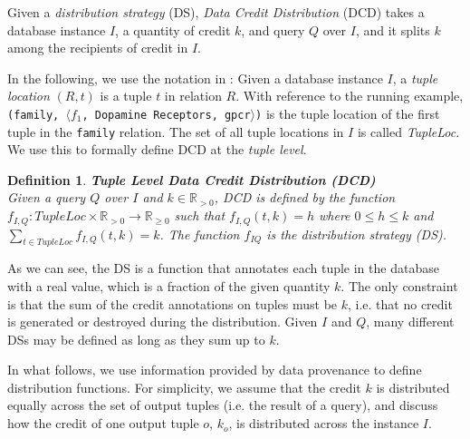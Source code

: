 \documentclass[preprint,12pt,sort&compress]{elsarticle}
\newtheorem{definition}{Definition}[section]
\newcommand{\eat}[1]{}
\begin{document}
Given a \emph{distribution strategy} (DS),  \emph{Data Credit Distribution} (DCD) takes a database instance $I$, a quantity of credit $k$, %
and query $Q$ over $I$, and it splits $k$ among the recipients of credit in $I$.

\eat{
In the following, we use the notation in \citet{CheneyProvSurvey}: a \emph{tuple location} is defined as a tuple in a relation in $I$, tagged with its name. It is indicated with $(R, t)$, where $R$ is the relation in the database, and $t$ is the tuple in $R$. With reference to the running example, \texttt{(family, $\langle f_1$, Dopamine Receptors, gpcr$\rangle$)} is the tuple location of the first tuple in the \texttt{family} relation.  The set of all the tuple locations in $I$ is called \emph{TupleLoc}.
The following is the definition of DCD at \emph{tuple level}. We refer to the level of tuple because the credit is annotated to tuples.}

In the following, we use the notation in \citet{CheneyProvSurvey}: Given a database instance $I$, a \emph{tuple location} $(R, t)$ is a tuple $t$ in  relation $R$. With reference to the running example, \texttt{(family, $\langle f_1$, Dopamine Receptors, gpcr$\rangle$)} is the tuple location of the first tuple in the \texttt{family} relation.  The set of all tuple locations in $I$ is called \emph{TupleLoc}.  We use this to formally define DCD at the \emph{tuple level}.


\begin{definition}
    \textbf{Tuple Level Data Credit Distribution (DCD)}~\citep{dosso2020data}
    \label{def:CDT}\\
    Given a query $Q$ over $I$ and $k \in \mathbb{R}_{>0}$, {DCD} is defined by the 
    function $f_{I, Q} : TupleLoc \times \mathbb{R}_{> 0} \rightarrow \mathbb{R}_{\geq0}$ such that $f_{I,Q}(t, k)=h$ where $0 \leq h \leq k$ and $\sum_{t \in TupleLoc}f_{I, Q}(t, k) = k$.  The function $f_{I Q}$ is the distribution strategy (DS).
\end{definition}

As we can see, the DS is a function that annotates each tuple in the database with a real value, which is a fraction of the given quantity $k$. The only constraint is that the sum of the credit annotations on tuples must be $k$, i.e. that no credit is generated or destroyed during the distribution.
Given $I$ and $Q$, many different DSs may be defined as long as they sum up to $k$. 

In what follows, we use information provided by data provenance to define distribution functions.
For simplicity, we assume that the credit $k$ is distributed equally across the set of output tuples (i.e. the result of a query), and discuss how the credit of one output tuple $o$, $k_o$, is distributed across the instance $I$.
\end{document}
